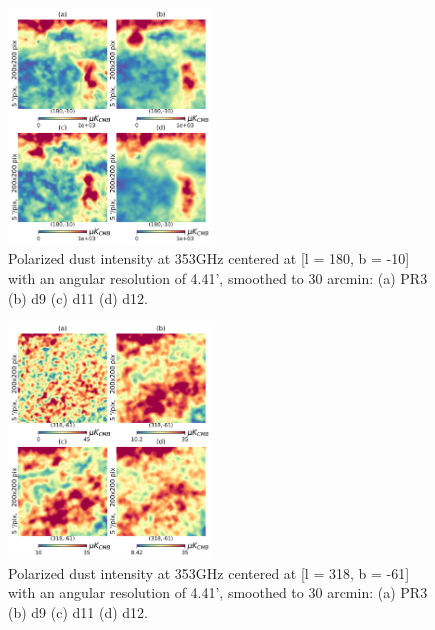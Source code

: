 \documentclass[twocolumn]{aastex631}
\begin{document}
\begin{figure}[ht!]
    \centering
    \includegraphics[width=0.48\textwidth]{figures/pol_gal_plane_smooth_30'.png}
    \caption{Polarized dust intensity at 353GHz centered at [l = 180, b = -10] with an angular resolution of 4.41', smoothed to 30 arcmin: (a) PR3 (b) d9 (c) d11 (d) d12.}
    \label{fig:353_pol_int_gal_plane}
\end{figure}

\begin{figure}[ht!]
    \centering
    \includegraphics[width=0.48\textwidth]{figures/pol_BK_smooth_30'.png}
    \caption{Polarized dust intensity at 353GHz centered at [l = 318, b = -61] with an angular resolution of 4.41', smoothed to 30 arcmin: (a) PR3 (b) d9 (c) d11 (d) d12.}
    \label{fig:353_pol_int_BK}
\end{figure}
\end{document}
